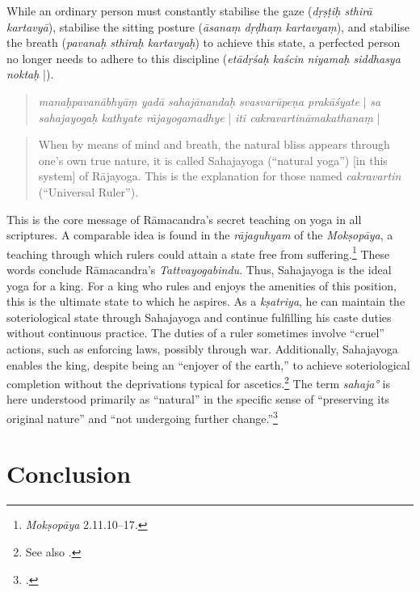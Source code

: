 While an ordinary person must constantly stabilise the gaze (\textit{dṛṣṭiḥ sthirā kartavyā}), stabilise the sitting posture (\textit{āsanaṃ dṛḍhaṃ kartavyaṃ}), and stabilise the breath (\textit{pavanaḥ sthiraḥ kartavyaḥ}) to achieve this state, a perfected person no longer needs to adhere to this discipline (\textit{etādṛśaḥ kaścin niyamaḥ siddhasya noktaḥ} |).
\begin{quote}
  \textit{manaḥpavanābhyāṃ yadā sahajānandaḥ svasvarūpeṇa prakāśyate} | \textit{sa sahajayogaḥ kathyate rājayogamadhye} | \textit{iti cakravartināmakathanaṃ} |
\end{quote}\begin{quote}
 When by means of mind and breath, the natural bliss appears through one's own true nature, it is called Sahajayoga (``natural yoga'') [in this system] of Rājayoga. This is the explanation for those named \textit{cakravartin} (``Universal Ruler'').
\end{quote}

This is the core message of Rāmacandra's secret teaching on yoga in all scriptures. A comparable idea is found in the \textit{rājaguhyam} of the \emph{Mokṣopāya}, a teaching through which rulers could attain a state free from suffering.\footnote{\emph{Mokṣopāya} 2.11.10–17.\nocite{moskopaya12}} These words conclude Rāmacandra's \emph{Tattvayogabindu}. Thus, Sahajayoga is the ideal yoga for a king. For a king who rules and enjoys the amenities of this position, this is the ultimate state to which he aspires. As a \textit{kṣatriya}, he can maintain the soteriological state through Sahajayoga and continue fulfilling his caste duties without continuous practice. The duties of a ruler sometimes involve ``cruel'' actions, such as enforcing laws, possibly through war. Additionally, Sahajayoga enables the king, despite being an ``enjoyer of the earth,'' to achieve soteriological completion without the deprivations typical for ascetics.\footnote{See also \citeauthor[2006: 121]{hanneder2006}.} The term \textit{sahaja°} is here understood primarily as ``natural'' in the specific sense of ``preserving its original nature'' and ``not undergoing further change.''\footnote{.} 
  
\section{Conclusion}
\label{comparisonconclusion}


